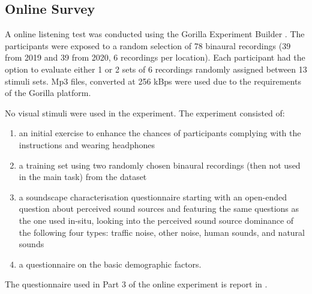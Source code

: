  \subsection{Online Survey}

   A online listening test was conducted using the Gorilla Experiment Builder \citep{AnwylIrvine2019Gorilla}. The participants were exposed to a random selection of 78 binaural recordings (39 from 2019 and 39 from 2020, 6 recordings per location). Each participant had the option to evaluate either 1 or 2 sets of 6 recordings randomly assigned between 13 stimuli sets. Mp3 files, converted at 256 kBps were used due to the requirements of the Gorilla platform.

   No visual stimuli were used in the experiment. The experiment consisted of:

   \begin{enumerate}
     \item an initial exercise to enhance the chances of participants complying with the instructions and wearing headphones
     \item a training set using two randomly chosen binaural recordings (then not used in the main task) from the dataset
     \item a soundscape characterisation questionnaire starting with an open-ended question about perceived sound sources and featuring the same questions as the one used in-situ, looking into the perceived sound source dominance of the following four types: traffic noise, other noise, human sounds, and natural sounds
     \item a questionnaire on the basic demographic factors.
   \end{enumerate}

   The questionnaire used in Part 3 of the online experiment is report in .

